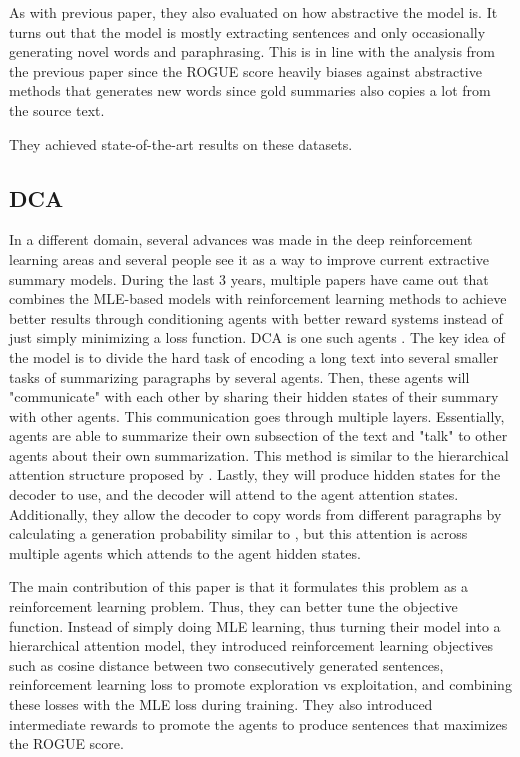 \documentclass[11pt,a4paper]{article}
\begin{document}
As with previous paper, they also evaluated on how abstractive the model is. It turns out that the model is mostly extracting sentences and only occasionally generating novel words and paraphrasing. This is in line with the analysis from the previous paper since the ROGUE score heavily biases against abstractive methods that generates new words since gold summaries also copies a lot from the source text.

They achieved state-of-the-art results on these datasets. 

\subsection{DCA}
In a different domain, several advances was made in the deep reinforcement learning areas and several people see it as a way to improve current extractive summary models. During the last 3 years, multiple papers have came out that combines the MLE-based models with reinforcement learning methods to achieve better results through conditioning agents with better reward systems instead of just simply minimizing a loss function. DCA is one such agents \cite{dca}. The key idea of the model is to divide the hard task of encoding a long text into several smaller tasks of summarizing paragraphs by several agents. Then, these agents will "communicate" with each other by sharing their hidden states of their summary with other agents. This communication goes through multiple layers. Essentially, agents are able to summarize their own subsection of the text and "talk" to other agents about their own summarization. This method is similar to the hierarchical attention structure proposed by \cite{lead}. Lastly, they will produce hidden states for the decoder to use, and the decoder will attend to the agent attention states. Additionally, they allow the decoder to copy words from different paragraphs by calculating a generation probability similar to \cite{pointer-generator}, but this attention is across multiple agents which attends to the agent hidden states. 

The main contribution of this paper is that it formulates this problem as a reinforcement learning problem. Thus, they can better tune the objective function. Instead of simply doing MLE learning, thus turning their model into a hierarchical attention model, they introduced reinforcement learning objectives such as cosine distance between two consecutively generated sentences, reinforcement learning loss to promote exploration vs exploitation, and combining these losses with the MLE loss during training. They also introduced intermediate rewards to promote the agents to produce sentences that maximizes the ROGUE score.
\end{document}
